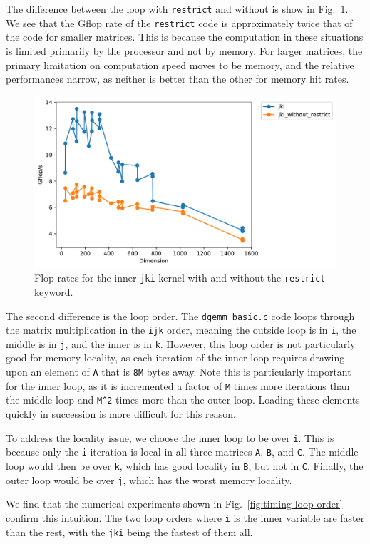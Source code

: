 \documentclass{article}
\begin{document}
The difference between the loop with \texttt{restrict} and without is show in Fig.~\ref{fig:timing-jki-restrict}. We see that the Gflop rate of the \texttt{restrict} code is approximately twice that of the code for smaller matrices. This is because the computation in these situations is limited primarily by the processor and not by memory. For larger matrices, the primary limitation on computation speed moves to be memory, and the relative performances narrow, as neither is better than the other for memory hit rates.


\begin{figure}
    \centering
    \includegraphics[width=0.6\columnwidth]{timing_jki_restrict.pdf}
    \caption{Flop rates for the inner \texttt{jki} kernel with and without the \texttt{restrict} keyword.}
    \label{fig:timing-jki-restrict}
\end{figure}

The second difference is the loop order. The \texttt{dgemm\_basic.c} code loops through the matrix multiplication in the \texttt{ijk} order, meaning the outside loop is in \texttt{i}, the middle is in \texttt{j}, and the inner is in \texttt{k}. However, this loop order is not particularly good for memory locality, as each iteration of the inner loop requires drawing upon an element of \texttt{A} that is \texttt{8M} bytes away. Note this is particularly important for the inner loop, as it is incremented a factor of \texttt{M} times more iterations than the middle loop and \texttt{M\^{}2} times more than the outer loop. Loading these elements quickly in succession is more difficult for this reason.

To address the locality issue, we choose the inner loop to be over \texttt{i}. This is because only the \texttt{i} iteration is local in all three matrices \texttt{A}, \texttt{B}, and \texttt{C}. The middle loop would then be over \texttt{k}, which has good locality in \texttt{B}, but not in \texttt{C}. Finally, the outer loop would be over \texttt{j}, which has the worst memory locality. 

We find that the numerical experiments shown in Fig.~\ref{fig:timing-loop-order} confirm this intuition. The two loop orders where \texttt{i} is the inner variable are faster than the rest, with the \texttt{jki} being the fastest of them all. 
\end{document}
